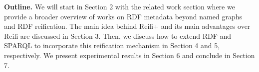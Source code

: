 \textbf{Outline.} We will start in Section 2 with the related work section where we provide a broader overview of works on RDF metadata beyond named graphs and RDF reification. The main idea behind Reifi+ and its main advantages over Reifi are discussed in Section 3. Then, we discuss how to extend RDF and SPARQL to incorporate this reification mechanism in Section 4 and 5, respectively. We present experimental results in Section 6 and conclude in Section 7. 